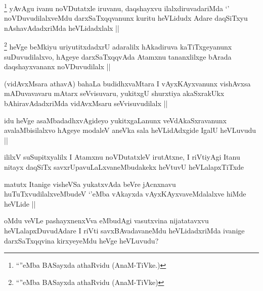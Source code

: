 
\begin{artha}
\footnote{``\stext''eMba BASayxda athaRvidu (AnaM-TiVke.)}
yAvAgu ivanu noVDutatxle iruvanu, daqshayxvu ilalxdiruvadariMda `\stext' noVDuvudilalxveMdu darxSaTxqqvanunx kuritu heVLidudx Adare daqSiTxyu nAshavAdadxriMda heVLidadxlalx ||
\end{artha}

\begin{artha}
\footnote{``\stext''eMba BASayxda athaRvidu (AnaM-TiVke)}
heVge beMkiyu uriyutitxdadxrU adaralilx hAkadiruva kaTiTxgeyanunx suDuvudilalxvo, hAgeye darxSaTxqqvAda Atamxnu tananxlilxge bArada daqshayxvananx noVDuvudilalx ||
\end{artha}



\begin{artha}
(vidAvxMsara athavA) bahaLa budidhxvaMtara I vAyxKAyxvanunx vishAvxsa mADuvavavaru mAtarx seVvisuvaru, yukitxgU shurxtiya akaSxrakUkx bAhiravAdadxriMda vidAvxMsaru seVvisuvudilalx ||
\end{artha}

\begin{artha}
idu heVge asaMbadadhxvAgideyo yukitxgaLanunx veVdAkaSxravanunx avalaMbisilalxvo hAgeye modaleV aneVka sala heVLidAdxgide IgalU heVLuvudu ||
\end{artha}


\begin{artha}
ililxV suSupitxyalilx I Atamxnu noVDutatxleV irutAtxne, I riVtiyAgi Itanu nitayx daqSiTx savxrUpavuLaLxvaneMbudakekx heVtuvU heVLalapxTiTxde
\end{artha}

\begin{artha}
matutx Itanige visheVSa yukatxvAda beVre jAcnxnavu huTuTxvudilalxveMbudeV `\stext'eMba vAkayxda vAyxKAyxvaveMdalalxve hiMde heVLide ||
\end{artha}

\begin{artha}
oMdu veVLe pashayxnenxVva eMbudAgi vasutxvina nijatatavxvu heVLalapxDuvudAdare I riVti savxBAvadavaneMdu heVLidadxriMda ivanige darxSaTxqqvina kirxyeyeMdu heVge heVLuvudu? 
\end{artha}

